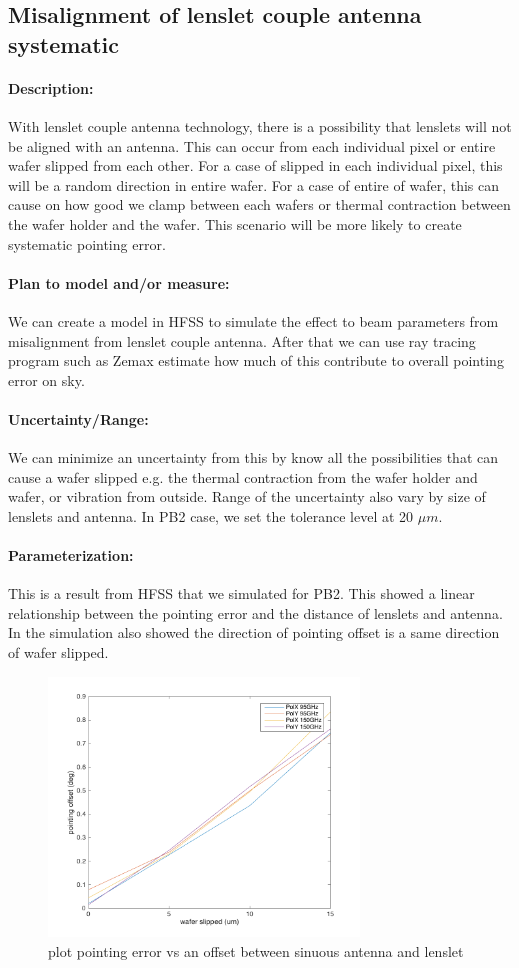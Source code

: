 \subsection{Misalignment of lenslet couple antenna systematic}

\paragraph{Description:}
With lenslet couple antenna technology, there is a possibility that lenslets will not be aligned with an antenna. This can occur from each individual pixel or entire wafer slipped from each other. For a case of  slipped in each individual pixel, this will be a random direction in entire wafer. For a case of entire of wafer, this can cause on how good we clamp between each wafers or thermal contraction between the wafer holder and the wafer. This scenario will be more likely to create systematic pointing error. 

\paragraph{Plan to model and/or measure:}
We can create a model in HFSS to simulate the effect to beam parameters from misalignment from lenslet couple antenna. After that we can use ray tracing program such as Zemax estimate how much of this contribute to overall pointing error on sky.

\paragraph{Uncertainty/Range:}
We can minimize an uncertainty from this by know all the possibilities that can cause a wafer slipped e.g. the thermal contraction from the wafer holder and wafer, or vibration from outside. Range of the uncertainty also vary by size of lenslets and antenna. In PB2 case, we set the tolerance level at 20 $\mu m$.

\paragraph{Parameterization:}
This is a result from HFSS that we simulated for PB2. This showed a linear relationship between the pointing error and the distance of lenslets and antenna. In the simulation also showed the direction of pointing offset is a same direction of wafer slipped. 
  
\begin{figure}
\centering
\includegraphics[width=3.25in]{figures/pointingOffset_waferslipped.png}
\caption{plot pointing error vs an offset between sinuous antenna and lenslet }
\label{poitingoffsetFromWaferslipped}
\end{figure}
